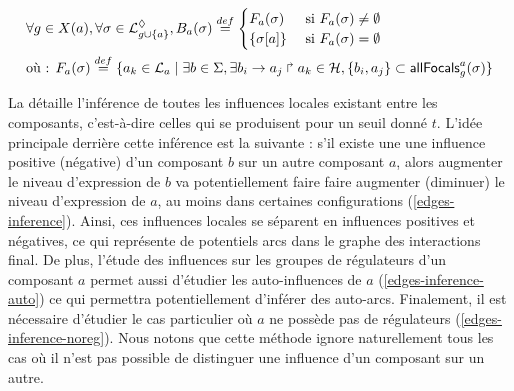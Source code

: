 \begin{align*}
  &\forall g \in X(a), \forall \sigma \in \mathcal{L}^\lozenge_{g \cup \{ a \}},
  B_a(\sigma) \stackrel{def}= 
  \begin{cases}
    F_a(\sigma)
      & \text{ si } F_a(\sigma) \neq \emptyset\\
    \{ {\sigma[a]} \}
      & \text{ si } F_a(\sigma) = \emptyset
  \end{cases}\\
  &\text{où : } F_a(\sigma) \stackrel{def}= \{ a_k \in \mathcal{L}_a \mid
    \exists b \in \Sigma, \exists b_i\rightarrow a_j\Rsh a_k \in \mathcal{H},
  \{ b_i, a_j \} \subset \mathsf{allFocals}^{a}_{g}(\sigma) \}\\
\end{align*}


La  détaille l'inférence de toutes les influences locales existant
entre les composants, c'est-à-dire celles qui se produisent pour un seuil donné $t$.
L'idée principale derrière cette inférence est la suivante :
s'il existe une une influence
positive (\resp négative) d'un composant $b$ sur un autre composant $a$,
alors augmenter le niveau d'expression de $b$
va potentiellement faire faire augmenter (\resp diminuer) le niveau d'expression de $a$,
au moins dans certaines configurations (\eqref{edges-inference}).
Ainsi, ces influences locales se séparent en influences positives et négatives,
ce qui représente de potentiels arcs dans le graphe des interactions final.
De plus, l'étude des influences sur les groupes de régulateurs d'un composant $a$
permet aussi d'étudier les auto-influences de $a$
(\eqref{edges-inference-auto})
ce qui permettra potentiellement d'inférer des auto-arcs.
Finalement, il est nécessaire d'étudier le cas particulier où $a$ ne possède pas de régulateurs
(\eqref{edges-inference-noreg}).
Nous notons que cette méthode ignore naturellement tous les cas où il n'est pas possible
de distinguer une influence d'un composant sur un autre.

